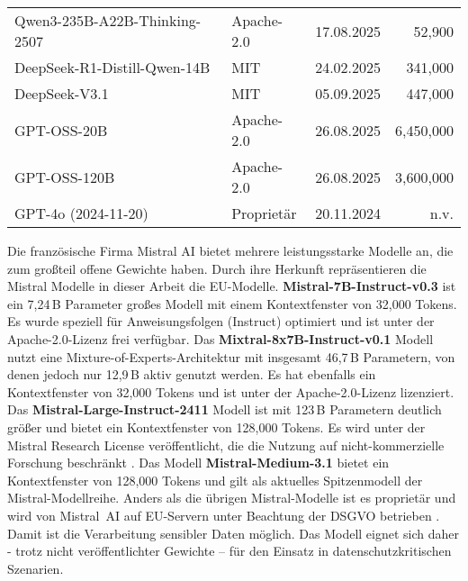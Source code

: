 \begin{sidewaystable}[htbp]
\begin{threeparttable}
\begin{subtable}[t]{0.49\linewidth}
\begin{tabular}{@{}p{6.3cm} l r r@{}}
                Qwen3-235B-A22B-Thinking-2507 & Apache-2.0 & 17.08.2025 & 52{,}900 \cite{HF_Qwen3_235B_2025} \\
                DeepSeek-R1-Distill-Qwen-14B & MIT & 24.02.2025 & 341{,}000 \cite{HF_DeepSeekR1_Distill_Qwen14B_2025} \\
                DeepSeek-V3.1 & MIT & 05.09.2025 & 447{,}000 \cite{HF_DeepSeek_V3_1_2025} \\
                GPT-OSS-20B & Apache-2.0 & 26.08.2025 & 6{,}450{,}000 \cite{OpenAI_GPTOSS_ModelCard_2025} \\
                GPT-OSS-120B & Apache-2.0 & 26.08.2025 & 3{,}600{,}000 \cite{OpenAI_GPTOSS_ModelCard_2025} \\
                GPT-4o (2024-11-20) & Proprietär & 20.11.2024 & n.v. \cite{openai-hello-gpt-4o} \\
                \bottomrule
            \end{tabular}
        \end{subtable}
    \end{threeparttable}
\end{sidewaystable}

Die französische Firma Mistral AI bietet mehrere leistungsstarke Modelle an, die zum großteil offene Gewichte haben. Durch ihre Herkunft repräsentieren die Mistral Modelle in dieser Arbeit die \ac{EU}-Modelle. \textbf{Mistral-7B-Instruct-v0.3} \cite{HF_Mistral7B_2025} ist ein 7,24\,B Parameter großes Modell mit einem Kontextfenster von 32{,}000 Tokens. Es wurde speziell für Anweisungsfolgen (Instruct) optimiert und ist unter der Apache-2.0-Lizenz frei verfügbar. Das \textbf{Mixtral-8x7B-Instruct-v0.1} Modell \cite{HF_Mixtral8x7B_2025} nutzt eine Mixture-of-Experts-Architektur mit insgesamt 46,7\,B Parametern, von denen jedoch nur 12,9\,B aktiv genutzt werden. Es hat ebenfalls ein Kontextfenster von 32{,}000 Tokens und ist unter der Apache-2.0-Lizenz lizenziert. Das \textbf{Mistral-Large-Instruct-2411} Modell \cite{HF_MistralLargeInstruct_2025} ist mit 123\,B Parametern deutlich größer und bietet ein Kontextfenster von 128{,}000 Tokens. Es wird unter der Mistral Research License veröffentlicht, die die Nutzung auf nicht-kommerzielle Forschung beschränkt \cite{MRL_Research_License}. Das Modell \textbf{Mistral-Medium-3.1} \cite{mistral_models_overview} bietet ein Kontextfenster von 128{,}000 Tokens und gilt als aktuelles Spitzenmodell der Mistral-Modellreihe. Anders als die übrigen Mistral-Modelle ist es proprietär und wird von Mistral~AI auf \ac{EU}-Servern unter Beachtung der \ac{DSGVO} betrieben \cite{mistral-gdpr, mistral-data-storing}. Damit ist die Verarbeitung sensibler Daten möglich. Das Modell eignet sich daher - trotz nicht veröffentlichter Gewichte – für den Einsatz in datenschutzkritischen Szenarien.

